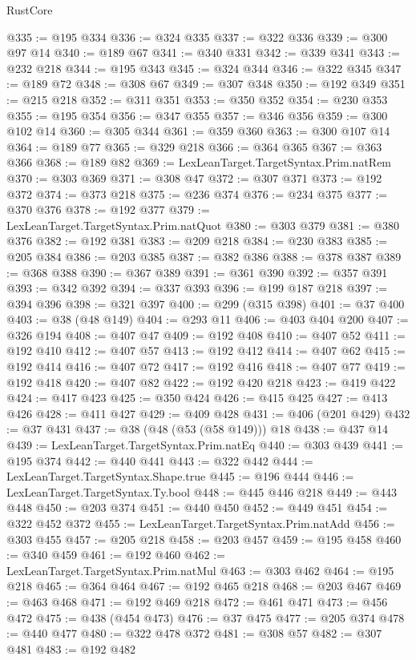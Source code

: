\begin{lexlean}{RustCore}
\begin{coremodule}
@335 := @195 @334
@336 := @324 @335
@337 := @322 @336
@339 := @300 @97 @14
@340 := @189 @67
@341 := @340 @331
@342 := @339 @341
@343 := @232 @218
@344 := @195 @343
@345 := @324 @344
@346 := @322 @345
@347 := @189 @72
@348 := @308 @67
@349 := @307 @348
@350 := @192 @349
@351 := @215 @218
@352 := @311 @351
@353 := @350 @352
@354 := @230 @353
@355 := @195 @354
@356 := @347 @355
@357 := @346 @356
@359 := @300 @102 @14
@360 := @305 @344
@361 := @359 @360
@363 := @300 @107 @14
@364 := @189 @77
@365 := @329 @218
@366 := @364 @365
@367 := @363 @366
@368 := @189 @82
@369 := LexLeanTarget.TargetSyntax.Prim.natRem
@370 := @303 @369
@371 := @308 @47
@372 := @307 @371
@373 := @192 @372
@374 := @373 @218
@375 := @236 @374
@376 := @234 @375
@377 := @370 @376
@378 := @192 @377
@379 := LexLeanTarget.TargetSyntax.Prim.natQuot
@380 := @303 @379
@381 := @380 @376
@382 := @192 @381
@383 := @209 @218
@384 := @230 @383
@385 := @205 @384
@386 := @203 @385
@387 := @382 @386
@388 := @378 @387
@389 := @368 @388
@390 := @367 @389
@391 := @361 @390
@392 := @357 @391
@393 := @342 @392
@394 := @337 @393
@396 := @199 @187 @218
@397 := @394 @396
@398 := @321 @397
@400 := @299 (@315 @398)
@401 := @37 @400
@403 := @38 (@48 @149)
@404 := @293 @11
@406 := @403 @404 @200
@407 := @326 @194
@408 := @407 @47
@409 := @192 @408
@410 := @407 @52
@411 := @192 @410
@412 := @407 @57
@413 := @192 @412
@414 := @407 @62
@415 := @192 @414
@416 := @407 @72
@417 := @192 @416
@418 := @407 @77
@419 := @192 @418
@420 := @407 @82
@422 := @192 @420 @218
@423 := @419 @422
@424 := @417 @423
@425 := @350 @424
@426 := @415 @425
@427 := @413 @426
@428 := @411 @427
@429 := @409 @428
@431 := @406 (@201 @429)
@432 := @37 @431
@437 := @38 (@48 (@53 (@58 @149))) @18
@438 := @437 @14
@439 := LexLeanTarget.TargetSyntax.Prim.natEq
@440 := @303 @439
@441 := @195 @374
@442 := @440 @441
@443 := @322 @442
@444 := LexLeanTarget.TargetSyntax.Shape.true
@445 := @196 @444
@446 := LexLeanTarget.TargetSyntax.Ty.bool
@448 := @445 @446 @218
@449 := @443 @448
@450 := @203 @374
@451 := @440 @450
@452 := @449 @451
@454 := @322 @452 @372
@455 := LexLeanTarget.TargetSyntax.Prim.natAdd
@456 := @303 @455
@457 := @205 @218
@458 := @203 @457
@459 := @195 @458
@460 := @340 @459
@461 := @192 @460
@462 := LexLeanTarget.TargetSyntax.Prim.natMul
@463 := @303 @462
@464 := @195 @218
@465 := @364 @464
@467 := @192 @465 @218
@468 := @203 @467
@469 := @463 @468
@471 := @192 @469 @218
@472 := @461 @471
@473 := @456 @472
@475 := @438 (@454 @473)
@476 := @37 @475
@477 := @205 @374
@478 := @440 @477
@480 := @322 @478 @372
@481 := @308 @57
@482 := @307 @481
@483 := @192 @482

\end{coremodule}
\end{lexlean}
